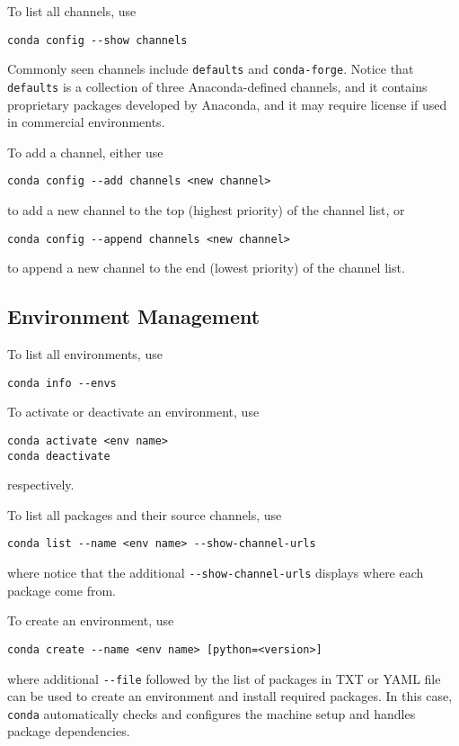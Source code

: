 To list all channels, use
\begin{lstlisting}
conda config --show channels
\end{lstlisting}

Commonly seen channels include \verb|defaults| and \verb|conda-forge|. Notice that \verb|defaults| is a collection of three Anaconda-defined channels, and it contains proprietary packages developed by Anaconda, and it may require license if used in commercial environments.

To add a channel, either use
\begin{lstlisting}
conda config --add channels <new channel>
\end{lstlisting}
to add a new channel to the top (highest priority) of the channel list, or
\begin{lstlisting}
conda config --append channels <new channel>
\end{lstlisting}
to append a new channel to the end (lowest priority) of the channel list.

\subsection{Environment Management}

To list all environments, use
\begin{lstlisting}
conda info --envs
\end{lstlisting}

To activate or deactivate an environment, use
\begin{lstlisting}
conda activate <env name>
conda deactivate
\end{lstlisting}
respectively.

To list all packages and their source channels, use
\begin{lstlisting}
conda list --name <env name> --show-channel-urls
\end{lstlisting}
where notice that the additional \verb|--show-channel-urls| displays where each package come from.

To create an environment, use
\begin{lstlisting}
conda create --name <env name> [python=<version>]
\end{lstlisting}
where additional \verb|--file| followed by the list of packages in TXT or YAML file can be used to create an environment and install required packages. In this case, \verb|conda| automatically checks and configures the machine setup and handles package dependencies. 


